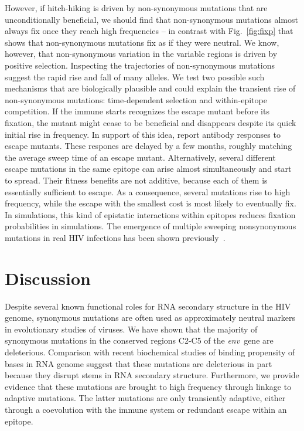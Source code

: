 \documentclass[rmp, twocolumn]{revtex4}
\newcommand{\env}{\textit{env}}
\newcommand{\FIG}[1]{Fig.~\ref{fig:#1}}
\begin{document}
However, if hitch-hiking is driven by non-synonymous mutations that are
unconditionally beneficial, we should find that non-synonymous mutations almost
always fix once they reach high frequencies -- in contrast with \FIG{fixp} that
shows that non-synonymous mutations fix as if they were neutral. We know,
however, that non-synonymous variation in the variable regions is driven by
positive selection. Inspecting the trajectories of non-synonymous mutations
suggest the rapid rise and fall of many alleles.  We test two possible such
mechanisms that are biologically plausible and could explain the transient rise
of non-synonymous mutations: time-dependent selection and within-epitope
competition. If the immune starts recognizes the escape mutant before its
fixation, the mutant might cease to be beneficial and disappears despite its
quick initial rise in frequency.  In support of this idea,
\citet{richman_rapid_2003, bunnik_autologous_2008} report antibody responses to
escape mutants. These respones are delayed by a few months, roughly matching the
average sweep time of an escape mutant. Alternatively, several different escape
mutations in the same epitope can arise almost simultaneously and start to
spread. Their fitness benefits are not additive, because each of them is
essentially sufficient to escape. As a consequence, several mutations rise to
high frequency, while the escape with the smallest cost is most likely to
eventually fix. In simulations, this kind of epistatic interactions within
epitopes reduces fixation probabilities in simulations.  The emergence of
multiple sweeping nonsynonymous mutations in real HIV infections has been shown
previously~\citep{moore_limited_2009, bar_early_2012}.

\section{Discussion}
Despite several known functional roles for RNA secondary structure in the HIV
genome, synonymous mutations are often used as approximately neutral markers in
evolutionary studies of viruses. We have shown that the majority of synonymous
mutations in the conserved regions C2-C5 of the \env~gene are deleterious.
Comparison with recent biochemical studies of binding propensity of bases in RNA
genome suggest that these mutations are deleterious in part because they disrupt
stems in RNA secondary structure. Furthermore, we provide evidence that these
mutations are brought to high frequency through linkage to adaptive mutations.
The latter  mutations are only transiently adaptive, either through a
coevolution with the immune system or redundant escape within an epitope. 
\end{document}

